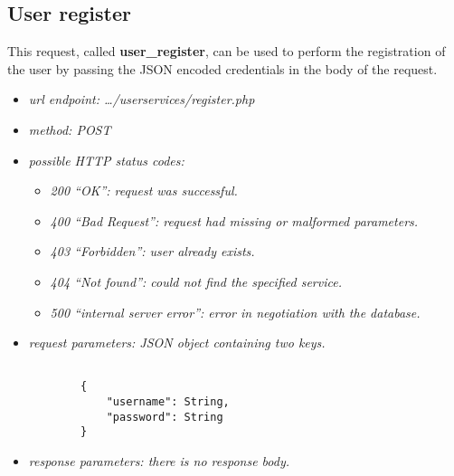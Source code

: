 \documentclass[a4paper,12pt]{article}
\begin{document}
        \clearpage
        \subsection[User register]{User register}

            \vspace{10pt}

            This request, called \textbf{user\_register}, can be used to perform the registration of the user by passing the JSON encoded credentials in the body of the request.

            \begin{itemize}

                \item \textit{url endpoint: \ldots/userservices/register.php}
                \item \textit{method: POST}
                \item \textit{possible HTTP status codes:}

                    \begin{itemize}

                        \item \textit{200 ``OK'': request was successful.}
                        \item \textit{400 ``Bad Request'': request had missing or malformed parameters.}
                        \item \textit{403 ``Forbidden'': user already exists.}
                        \item \textit{404 ``Not found'': could not find the specified service.}
                        \item \textit{500 ``internal server error'': error in negotiation with the database.}

                    \end{itemize}

                \item \textit{request parameters: JSON object containing two keys.}
    
    \begin{verbatim}
                        
        {
            "username": String,
            "password": String
        }

    \end{verbatim}

                \item \textit{response parameters: there is no response body.}

            \end{itemize}
\end{document}
